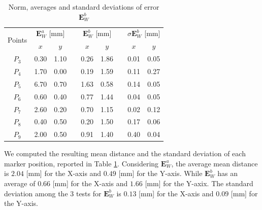 \documentclass[a4paper, 10 pt, conference]{ieeeconf}      %
\begin{document}
\begin{table}[h!]
	\centering
	\caption{Norm, averages and standard deviations of error $\mathbf{E}^b_{W}$}
	\label{tab:laser}
	\begin{adjustbox}{max width=\columnwidth}
		\begin{tabular}{ccccccccc}
			\toprule
			\multirow{2}{*}{Points} & \multicolumn{2}{c}{$\mathbf{E}^a_{W}$ [mm]} &  & \multicolumn{2}{c}{$\mathbf{E}^b_{W}$ [mm]} &  & \multicolumn{2}{c}{$\sigma\mathbf{E}^b_{W}$ [mm]} \\ \cmidrule{2-3} \cmidrule{5-6} \cmidrule{8-9} 
			& $x$                & $y$               &  & $x$                     & $y$                     &  & $x$                   & $y$                  \\ \midrule
                                $P_3$                      & 0.30               & 1.10              &  & 0.26                    & 1.86                    &  & 0.01                  & 0.05                 \\
			$P_4$                      & 1.70               & 0.00              &  & 0.19                    & 1.59                    &  & 0.11                  & 0.27                 \\ 
			$P_5$                      & 6.70               & 0.70              &  & 1.63                    & 0.58                    &  & 0.14                  & 0.05                 \\
			$P_6$                      & 0.60               & 0.40              &  & 0.77                    & 1.44                    &  & 0.04                  & 0.05                 \\
			$P_7$                      & 2.60               & 0.20              &  & 0.70                    & 1.15                    &  & 0.02                  & 0.12                 \\
			$P_8$                     & 0.40               & 0.50              &  & 0.20                    & 1.50                    &  & 0.17                  & 0.06                 \\
			$P_9$                      & 2.00               & 0.50              &  & 0.91                    & 1.40                    &  & 0.40                  & 0.04                 \\ \bottomrule
		\end{tabular}%
	\end{adjustbox}
\end{table}

We computed the resulting mean distance and the standard deviation of each marker position, reported in Table \ref{tab:laser}. Considering $\mathbf{E}^a_{W}$, the average mean distance is $2.04$ [mm] for the X-axis and $0.49$ [mm] for the Y-axis. While $\mathbf{E}^b_{W}$ has an average of $0.66$ [mm] for the X-axis and $1.66$ [mm] for the Y-axix. The standard deviation among the 3 tests for $\mathbf{E}^b_{W}$ is $0.13$ [mm] for the X-axis and $0.09$ [mm] for the Y-axis.
\end{document}
